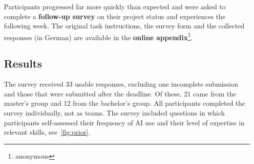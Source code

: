 \documentclass[english,anonymous]{lni}
\begin{document}
Participants progressed far more quickly than expected and were asked to complete a {\bf follow-up survey}  on their project status and experiences the following week. 
The original task instructions, the survey form and the collected responses (in German)  are available in the  {\bf online appendix}\footnote{anonymous
}.

\subsection{Results}

The survey received 33 usable responses, excluding one incomplete submission and those that were submitted after the deadline. Of these, 21 came from the master's group and 12 from the bachelor's group. All participants completed the survey individually, not as teams.
The survey included questions in which participants self-assessed their frequency of AI use and their level of expertise in relevant skills, see~\cref{fig:prior}.
\end{document}
